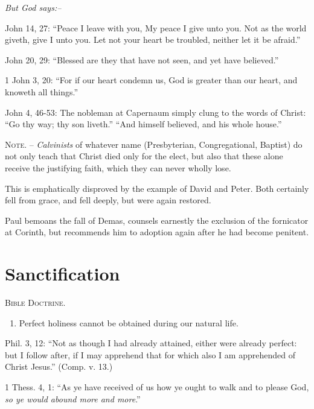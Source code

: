 \documentclass[
]{book}
\providecommand{\tightlist}{%
  \setlength{\itemsep}{0pt}\setlength{\parskip}{0pt}}
\begin{document}
\textsl{But God says:--}

John 14, 27: ``Peace I leave with you, My peace I give unto you. Not as the world giveth, give I unto you. Let not your heart be troubled, neither let it be afraid.''

John 20, 29: ``Blessed are they that have not seen, and yet have believed.''

1 John 3, 20: ``For if our heart condemn us, God is greater than our heart, and knoweth all things.''

John 4, 46-53: The nobleman at Capernaum simply clung to the words of Christ: ``Go thy way; thy son liveth.'' ``And himself believed, and his whole house.''

\textsc{Note.} -- \emph{Calvinists} of whatever name (Presbyterian, Congregational, Baptist) do not only teach that Christ died only for the elect, but also that these alone receive the justifying faith, which they can never wholly lose.

This is emphatically disproved by the example of David and Peter. Both certainly fell from grace, and fell deeply, but were again restored.

Paul bemoans the fall of Demas, counsels earnestly the exclusion of the fornicator at Corinth, but recommends him to adoption again after he had become penitent.

\section*{\texorpdfstring{Sanctification}{Sanctification}}\label{sanctification}

\begin{center}
\textsc{Bible Doctrine.}
\end{center}

\begin{enumerate}
\def\labelenumi{\alph{enumi}.}
\tightlist
\item
  Perfect holiness cannot be obtained during our natural life.
\end{enumerate}

Phil. 3, 12: ``Not as though I had already attained, either were already perfect: but I follow after, if I may apprehend that for which also I am apprehended of Christ Jesus.'' (Comp. v. 13.)

1 Thess. 4, 1: ``As ye have received of us how ye ought to walk and to please God, \emph{so ye would abound more and more}.''
\end{document}
